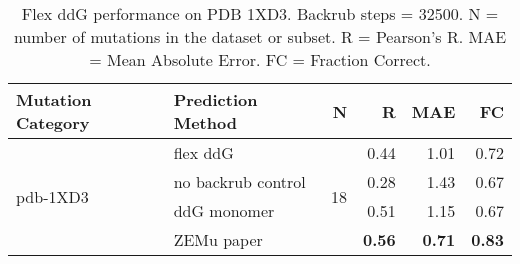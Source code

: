 \begin{table}
  \begin{tabular}{llrrrr}
\toprule
Mutation Category &   Prediction Method &   N &    R &  MAE &   FC \\
\midrule
 \multirow{ 4}{*}{pdb-1XD3} & flex ddG & \multirow{ 4}{*}{18} & 0.44 & 1.01 & 0.72  \\
 & no backrub control & & 0.28 & 1.43 & 0.67  \\
 & ddG monomer & & 0.51 & 1.15 & 0.67  \\
 & ZEMu paper & & \textbf{0.56} & \textbf{0.71} & \textbf{0.83}  \\
\bottomrule
\end{tabular}
  \caption[Flex ddG performance on PDB 1XD3]{
    Flex ddG performance on PDB 1XD3. Backrub steps = 32500. N = number of mutations in the dataset or subset. R = Pearson's R. MAE = Mean Absolute Error. FC = Fraction Correct.
  } \label{tab:table-pdb-1XD3}
\end{table}
